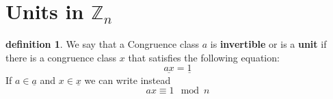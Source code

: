 \documentclass[10pt]{article}
\newcommand{\Z}{\mathbb{Z}}
\theoremstyle{definition}
\newtheorem{definition}[theorem]{definition}
\theoremstyle{remark}
\def\Z{\mathbb{ Z}}
\begin{document}



\section{Units in $\Z_n$}
\begin{definition}
We say that a Congruence class \underline{$a$} is \textbf{invertible} or is a \textbf{unit} if there is a congruence class \underline{$x$} that satisfies the following equation: $$\underline{ax} = \underline{1}$$
If $a \in \underline{a}$ and $x \in \underline{x}$ we can write instead $$ax\equiv 1 \mod n$$
\end{definition}
\end{document}
